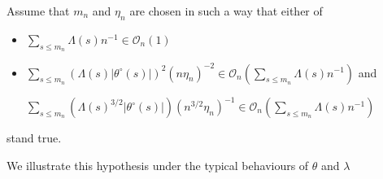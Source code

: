 \begin{as}\label{AS_BAYES_GAUSS_CONTRACT_THRESHOLD}
Assume that $m_{n}$ and $\eta_{n}$ are chosen in such a way that either of
\begin{itemize}
\item $\sum\nolimits_{s \leq m_{n}} \Lambda(s)n^{-1} \in \mathcal{O}_{n}(1)$
\item $\sum\nolimits_{ s \leq m_{n}} (\Lambda(s) \vert\theta^{\circ}(s)\vert)^{2}(n \eta_{n})^{-2} \in \mathcal{O}_{n}\left(\sum\nolimits_{ s \leq m_{n}} \Lambda(s) n^{-1}\right)$ and

$\sum\nolimits_{ s \leq m_{n}} (\Lambda(s)^{3/2} \left\vert\theta^{\circ}(s)\right\vert)(n^{3/2} \eta_{n})^{-1} \in \mathcal{O}_{n}\left(\sum\nolimits_{ s \leq m_{n}} \Lambda(s)n^{-1}\right)$
\end{itemize}
stand true.
\assEnd
\end{as}

We illustrate this hypothesis under the typical behaviours of $\theta$ and $\lambda$

